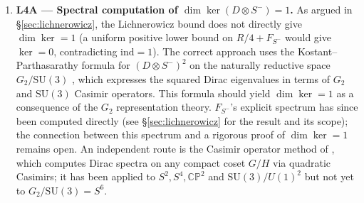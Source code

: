 \documentclass[12pt,a4paper]{article}
\newcommand{\ind}{\mathrm{ind}}
\begin{document}
\begin{enumerate}
  Confirming this
  physical input is the remaining open question, to be addressed in collaboration with
  T.~Lawrence.

\item \textbf{L4A --- Spectral computation of $\dim\ker(D\otimes S^-)=1$.}
  As argued in \S\ref{sec:lichnerowicz}, the Lichnerowicz bound does not directly give
  $\dim\ker=1$ (a uniform positive lower bound on $R/4+F_{S^-}$ would give $\ker=0$,
  contradicting $\ind=1$). The correct approach uses the Kostant--Parthasarathy formula
  for $(D\otimes S^-)^2$ on the naturally reductive space $G_2/\mathrm{SU}(3)$
  \cite{Agricola2002}, which expresses the squared Dirac eigenvalues in terms of $G_2$
  and $\mathrm{SU}(3)$ Casimir operators. This formula should yield $\dim\ker=1$ as a
  consequence of the $G_2$ representation theory. $F_{S^-}$'s explicit spectrum has since
  been computed directly (see \S\ref{sec:lichnerowicz} for the result and its scope); the
  connection between this spectrum and a rigorous proof of $\dim\ker=1$ remains open.
  An independent route is the Casimir operator method of \cite{Dolan2003}, which computes
  Dirac spectra on any compact coset $G/H$ via quadratic Casimirs; it has been applied to
  $S^2, S^4, \mathbb{CP}^2$ and $\mathrm{SU}(3)/U(1)^2$ but not yet to
  $G_2/\mathrm{SU}(3)=S^6$.


\end{enumerate}
\end{document}
